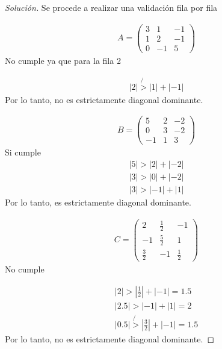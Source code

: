 \documentclass[12pt]{book}
\newenvironment{solucion}
  {\renewcommand\qedsymbol{$\square$}\begin{proof}[Solución]}
  {\end{proof}}
\begin{document}
\begin{solucion}
Se procede a realizar una validación fila por fila

\begin{align*}
    A=\begin{pmatrix}
    3 & 1 & -1\\
    1 & 2 & -1\\
    0 & -1 & 5
    \end{pmatrix}
\end{align*}
No cumple ya que para la fila 2 

\begin{align*}
    |2|\not{>} |1| + |-1|
\end{align*}
Por lo tanto, no es estrictamente diagonal dominante.


\begin{align*}
    B=\begin{pmatrix}
    5 & 2 & -2\\
    0 & 3 & -2\\
   -1 & 1 & 3
   \end{pmatrix}
\end{align*}
Si cumple 
\begin{align*}
   |5|>|2|+|-2|\\
   |3|>|0|+|-2|\\
   |3|>|-1|+|1|
\end{align*}
Por lo tanto, es estrictamente diagonal dominante.

\begin{align*}
C=\begin{pmatrix}
   2 & \frac{1}{2} & -1\\
  -1 & \frac{5}{2} & 1\\
  \frac{3}{2} & -1 & \frac{1}{2}
  \end{pmatrix}
\end{align*}
No cumple

\begin{align*}
    |2|>|\frac{1}{2}| + |-1|=1.5\\
    |2.5|>|-1|+|1|=2\\
    |0.5|\not{>}|\frac{3}{2}|+|-1|=1.5
\end{align*}
Por lo tanto, no es estrictamente diagonal dominante.
\end{solucion}
\end{document}
